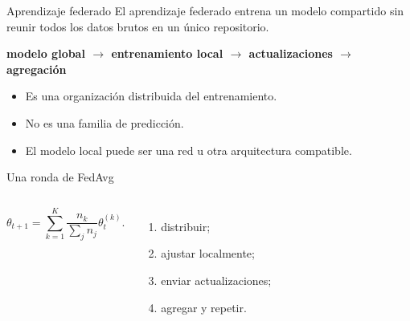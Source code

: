 \documentclass[aspectratio=169,10pt]{beamer}
\newcommand{\concepto}[1]{\textcolor{UAPTeal}{\textbf{#1}}}
\begin{document}
\begin{frame}{Aprendizaje federado}
  El aprendizaje federado entrena un modelo compartido sin reunir todos los datos brutos en un único repositorio.
  \begin{center}
    \concepto{modelo global $\rightarrow$ entrenamiento local $\rightarrow$ actualizaciones $\rightarrow$ agregación}
  \end{center}
  \begin{itemize}
    \item Es una organización distribuida del entrenamiento.
    \item No es una familia de predicción.
    \item El modelo local puede ser una red u otra arquitectura compatible.
  \end{itemize}
\end{frame}

\begin{frame}{Una ronda de FedAvg}
  \begin{columns}[T]
    \centering
    \small
    \[
      \theta_{t+1}=\sum_{k=1}^{K}\frac{n_k}{\sum_jn_j}\theta_t^{(k)}.
    \]
    \begin{enumerate}
      \item distribuir;
      \item ajustar localmente;
      \item enviar actualizaciones;
      \item agregar y repetir.
    \end{enumerate}
  \end{columns}
\end{frame}
\end{document}
